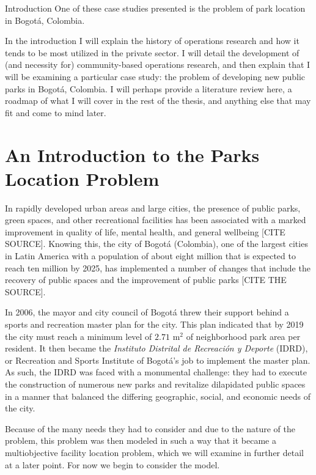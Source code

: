 \documentclass[12pt]{pom_thesis}
\begin{document}
\begin{chapter}{Introduction}
	One of these case studies presented is the problem of park location in Bogot\'{a}, Colombia.

In the introduction I will explain the history of operations research and how it tends to be most utilized in the private sector. I will detail the development of (and necessity for) community-based operations research, and then explain that I will be examining a particular case study: the problem of developing new public parks in Bogot\'a, Colombia. I will perhaps provide a literature review here, a roadmap of what I will cover in the rest of the thesis, and anything else that may fit and come to mind later.

\section{An Introduction to the Parks Location Problem}

	In rapidly developed urban areas and large cities, the presence of public parks, green spaces, and other recreational facilities has been associated with a marked improvement in quality of life, mental health, and general wellbeing [CITE SOURCE]. Knowing this, the city of Bogot\'{a} (Colombia), one of the largest cities in Latin America with a population of about eight million that is expected to reach ten million by 2025, has implemented a number of changes that include the recovery of public spaces and the improvement of public parks [CITE THE SOURCE]. 
	
	In 2006, the mayor and city council of Bogot\'{a} threw their support behind a sports and recreation master plan for the city. This plan indicated that by 2019 the city must reach a minimum level of $2.71$  $\textrm{m}^2$ of neighborhood park area per resident. It then became the \textit{Instituto Distrital de Recreaci\'{o}n y Deporte} (IDRD), or Recreation and Sports Institute of Bogot\'{a}'s job to implement the master plan. As such, the IDRD was faced with a monumental challenge: they had to execute the construction of numerous new parks and revitalize dilapidated public spaces in a manner that balanced the differing geographic, social, and economic needs of the city. 
	
	Because of the many needs they had to consider and due to the nature of the problem, this problem was then modeled in such a way that it became a multiobjective facility location problem, which we will examine in further detail at a later point. For now we begin to consider the model.
\end{chapter}
\end{document}
